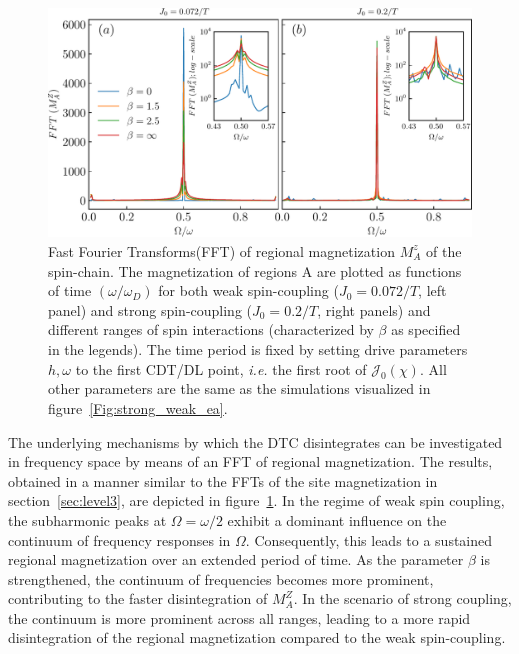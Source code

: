 \documentclass[12pt]{iopart}
\begin{document}
\begin{figure}[t]
	\centering
	\hspace{1.5cm}\includegraphics[width = 13cm]{figure10.pdf}
	\caption{
		Fast Fourier Transforms(FFT) of regional magnetization $M^z_{A}$ of the spin-chain. The magnetization of regions A are plotted as functions of time $(\omega/\omega_D)$ for both weak spin-coupling ($J_0=0.072/T$, left panel) and strong spin-coupling ($J_0=0.2/T$, right panels) and different ranges of spin interactions (characterized by $\beta$ as specified in the legends). The time period is fixed by setting drive parameters $h,\omega$ to the first CDT/DL point, \textit{i.e.} the first root of $\mathcal{J}_0(\chi)$. All other parameters are the same as the simulations visualized in figure~\ref{Fig:strong_weak_ea}.}
	\label{Fig:regionalFFT}
\end{figure}
The underlying mechanisms by which the DTC disintegrates can be investigated in frequency space by means of an FFT of regional magnetization. The results, obtained in a manner similar to the FFTs of the site magnetization in section~\ref{sec:level3}, are depicted in figure~\ref{Fig:regionalFFT}. In the regime of weak spin coupling, the subharmonic peaks at $\Omega=\omega/2$ exhibit a dominant influence on the continuum of frequency responses in $\Omega$. Consequently, this leads to a sustained regional magnetization over an extended period of time. As the parameter $\beta$ is strengthened,  the continuum of frequencies becomes more prominent, contributing to the faster disintegration of $M^Z_A$. In the scenario of strong coupling, the continuum is more prominent across all ranges, leading to a more rapid disintegration of the regional magnetization compared to the weak spin-coupling.

	
	
\end{document}
